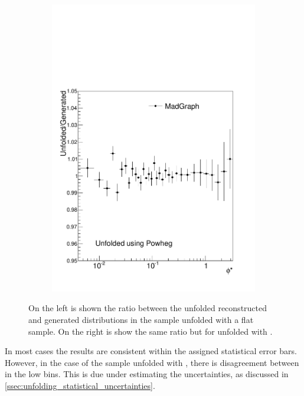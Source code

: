 \begin{figure}[!htbp]
\begin{subfigure}[b]{\SideBySidePlotWidth}
        \includegraphics[width=\textwidth]{figures/BinM_PM.pdf}
        \caption{}
        \label{fig:unfolding_madgraph_with_powheg}
    \end{subfigure}
    \caption[
        The ratio of reconstructed over generated \phistar in MC unfolded with
        the other generator sample.
    ]{
        On the left is shown the ratio between the unfolded reconstructed and
        generated \phistar distributions in the \POWHEG sample unfolded with a
        flat \MADGRAPH sample. On the right is show the same ratio but for
        \MADGRAPH unfolded with \POWHEG.
    }
    \label{fig:cross_mc_unfolding}
\end{figure}

In most cases the results are consistent within the assigned statistical error
bars. However, in the case of the \MADGRAPH sample unfolded with \POWHEG, there
is disagreement between in the low \phistar bins. This is due \RooUnfold under
estimating the uncertainties, as discussed in
\cref{ssec:unfolding_statistical_uncertainties}.

